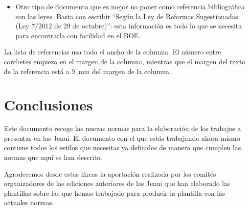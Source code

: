 \documentclass[twocolumn,twoside,a4paper, 10pt]{article}
\begin{document}
\begin{itemize}
	\item Otro tipo de documento que es mejor no poner como referencia 
	bibliográfica son las leyes. Basta con escribir ``Según la Ley de 
	Reformas Sugestionadas (Ley 7/2012 de 29 de octubre)'': esta 
	información es todo lo que se necesita para encontrarla con 
	facilidad en el BOE.
\end{itemize}

La lista de referencias usa todo el ancho de la columna.  El número 
entre corchetes empieza en el margen de la columna, mientras que el margen
del texto de la referencia está a 9~mm del margen de la columna.


\section{Conclusiones}

Este documento recoge las nuevas normas para la elaboración de los trabajos 
a presentar en las Jenui. El documento con el que estás trabajando ahora 
mismo contiene todos los estilos que necesitas ya definidos de manera que 
cumplen las normas que aquí se han descrito.

Agradecemos desde estas líneas la aportación realizada por los comités 
organizadores de las ediciones anteriores de las Jenui que han elaborado 
las plantillas sobre las que hemos trabajado para producir la plantilla 
con las actuales normas.
\balance{}


\end{document}
